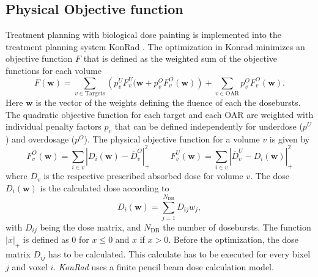 \subsection{Physical Objective function}\label{chap:objectivefunctions}
Treatment planning with biological dose painting is implemented into the treatment planning system KonRad \cite{nill}. The optimization in Konrad minimizes an objective function $F$ that is defined as the weighted sum of the objective functions for each volume
\begin{equation}
F(\mathbf{w}) = \sum\limits_{v\in\mathrm{Targets}}\left(p_v^UF_v^U(\mathbf{w}+p_v^OF_v^O(\mathbf{w})\right) + \sum\limits_{v\in\mathrm{OAR}}p_v^OF_v^O(\mathbf{w}).
\end{equation}
Here $\mathbf{w}$ is the vector of the weights defining the fluence of each the dosebursts. The quadratic objective function for each target and each OAR are weighted with individual penalty factors $p_v$ that can be defined independently for underdose ($p^U$) and overdosage ($p^O$). The physical objective function for a volume $v$ is given by \cite{pmid11444513}
\begin{equation}
F_v^O (\mathbf{w}) = \sum\limits_{i\in v} \left|D_i(\mathbf{w})-\overline{D}_v^O\right|_+^2\hspace{1cm}F_v^U (\mathbf{w}) = \sum\limits_{i\in v} \left|\overline{D}_v^U-D_i(\mathbf{w})\right|_+^2
\end{equation}
where $\overline{D}_v$ is the respective prescribed absorbed dose for volume $v$. The dose $D_i(\mathbf{w})$ is the calculated dose according to
\begin{equation}
D_i(\mathbf{w}) = \sum\limits_{j=1}^{N_{\mathrm{DB}}} D_{ij}w_j,
\end{equation}
with $D_{ij}$ being the dose matrix, and $N_{\mathrm{DB}}$ the number of dosebursts. The function $|x|_+$ is defined as 0 for $x\leq0$ and $x$ if $x>0$. Before the optimization, the dose matrix $D_{ij}$ has to be calculated. This calculate has to be executed for every bixel $j$ and voxel $i$. \textit{KonRad} uses a finite pencil beam dose calculation model\cite{nill}.
